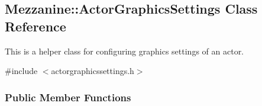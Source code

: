 \hypertarget{classMezzanine_1_1ActorGraphicsSettings}{
\subsection{Mezzanine::ActorGraphicsSettings Class Reference}
\label{classMezzanine_1_1ActorGraphicsSettings}
}


This is a helper class for configuring graphics settings of an actor.  




{\ttfamily \#include $<$actorgraphicssettings.h$>$}

\subsubsection*{Public Member Functions}
